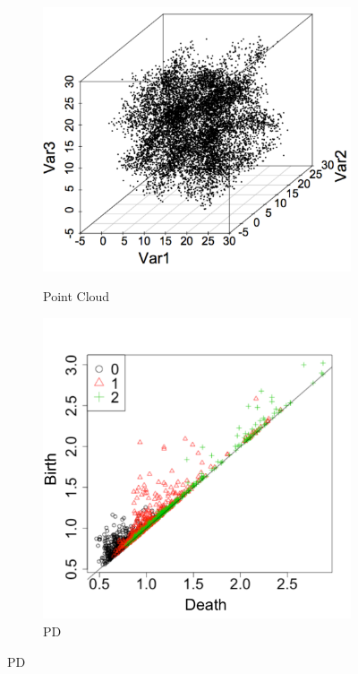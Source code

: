 \documentclass[12pt]{article}
\begin{document}
\begin{figure}[htbp]
   \centering 
  \begin{subfigure}{.24\textwidth}
    \centering
        \caption{Point Cloud}       \includegraphics[width=\linewidth]{test_pics_1.pdf}
    \label{fig:examplestest1}
  \end{subfigure}
    \begin{subfigure}{.24\textwidth}
    \centering
        \caption{PD}  \includegraphics[width=\linewidth]{test_pics_2.pdf}

\end{subfigure}
\end{figure}
\end{document}
